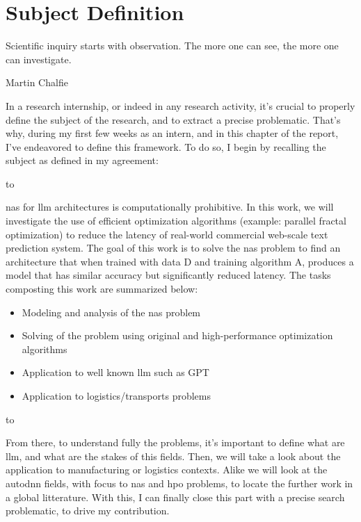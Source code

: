 \chapter{Subject Definition}
\label{chap:subject_def}

\epigraph{Scientific inquiry starts with observation. The more one can see, the more one can investigate.}{Martin Chalfie}

In a research internship, or indeed in any research activity, it's crucial to properly define the subject of the research, and to extract a precise problematic. That's why, during my first few weeks as an intern, and in this chapter of the report, I've endeavored to define this framework. To do so, I begin by recalling the subject as defined in my agreement: 

\noindent\hbox to \textwidth{\hrulefill}

\acrshort{nas} for \acrshort{llm} architectures is computationally prohibitive. In this work, we will investigate the use of efficient optimization algorithms (example: parallel fractal optimization) to reduce the latency of real-world commercial web-scale text prediction system. The goal of this work is to solve the \acrshort{nas} problem to find an architecture that when trained with data D and training algorithm A, produces a model that has similar accuracy but significantly reduced latency.
The tasks composting this work are summarized below:
\begin{itemize}
    \item Modeling and analysis of the \acrshort{nas} problem
    \item Solving of the problem using original and high-performance optimization algorithms
    \item Application to well known \acrshort{llm} such as GPT
    \item Application to logistics/transports problems
\end{itemize}
\noindent\hbox to \textwidth{\hrulefill}


From there, to understand fully the problems, it's important to define what are \acrshort{llm}, and what are the stakes of this fields. Then, we will take a look about the application to manufacturing or logistics contexts. Alike we will look at the \acrshort{autodnn} fields, with focus to \acrshort{nas} and \acrshort{hpo} problems, to locate the further work in a global litterature. With this, I can finally close this part with a precise search problematic, to drive my contribution.

